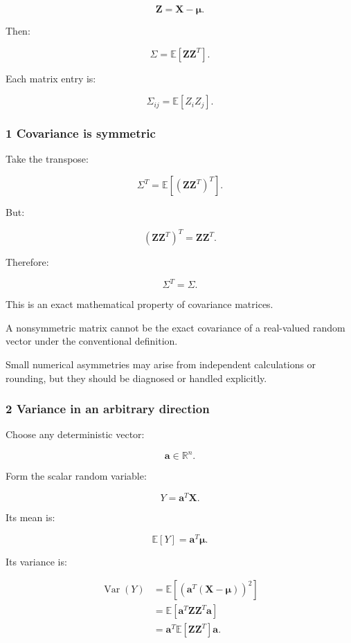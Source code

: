 \[
 \mathbf Z=\mathbf X-\boldsymbol\mu.
\]

Then:

\[
 \Sigma=\mathbb E[\mathbf Z\mathbf Z^T].
\]

Each matrix entry is:

\[
 \Sigma_{ij}=\mathbb E[Z_iZ_j].
\]

\subsubsection{1 Covariance is symmetric}\label{02-foundations-ii-ch024-covariance-is-symmetric}

\hypertarget{02-foundations-ii-ch024-covariance-is-symmetric}{}

Take the transpose:

\[
 \Sigma^T = \mathbb E[(\mathbf Z\mathbf Z^T)^T].
\]

But:

\[
 (\mathbf Z\mathbf Z^T)^T = \mathbf Z\mathbf Z^T.
\]

Therefore:

\[
 \boxed{\Sigma^T=\Sigma}.
\]

This is an exact mathematical property of covariance matrices.

A nonsymmetric matrix cannot be the exact covariance of a real-valued random vector under the conventional definition.

Small numerical asymmetries may arise from independent calculations or rounding, but they should be diagnosed or handled explicitly.

\subsubsection{2 Variance in an arbitrary direction}\label{02-foundations-ii-ch024-variance-in-an-arbitrary-direction}

\hypertarget{02-foundations-ii-ch024-variance-in-an-arbitrary-direction}{}

Choose any deterministic vector:

\[
 \mathbf a\in\mathbb R^n.
\]

Form the scalar random variable:

\[
 Y=\mathbf a^T\mathbf X.
\]

Its mean is:

\[
 \mathbb E[Y]=\mathbf a^T\boldsymbol\mu.
\]

Its variance is:

\[
 \begin{aligned} \operatorname{Var}(Y) &= \mathbb E[ (\mathbf a^T(\mathbf X-\boldsymbol\mu))^2 ]\\ &= \mathbb E[ \mathbf a^T\mathbf Z\mathbf Z^T\mathbf a ]\\ &= \mathbf a^T\mathbb E[\mathbf Z\mathbf Z^T]\mathbf a. \end{aligned}
\]

